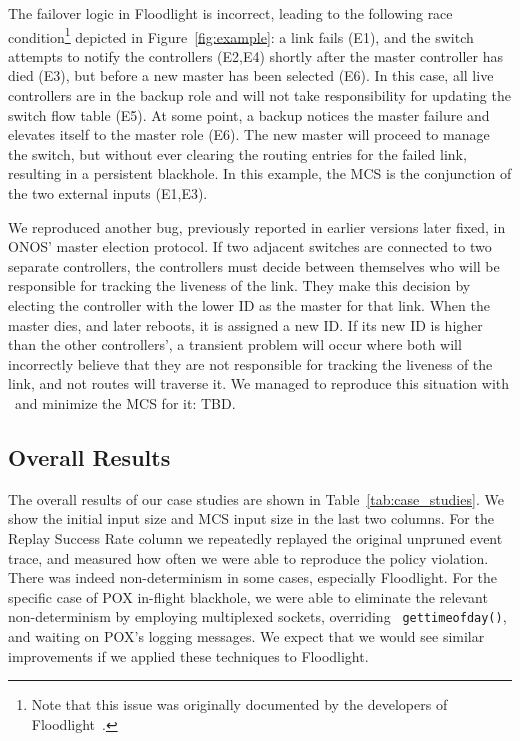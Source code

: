 {The failover logic in Floodlight is incorrect, leading to the
following race condition\footnote{Note that this issue was
originally documented by the developers of Floodlight~\cite{floodlight_bug}.} depicted in
Figure~\ref{fig:example}:
a link fails (E1), and the switch attempts to notify the controllers (E2,E4) shortly after the master
controller has died (E3), but before a new master has been selected (E6). In this case, all live controllers are in
the backup role and will not take responsibility for updating the switch
flow table (E5). At some point, a backup notices the master failure and
elevates itself to the master role (E6). The new master will proceed to manage
the switch, but without ever clearing the routing entries for
the failed link, resulting in a persistent blackhole. In this example, the MCS
is the conjunction of the two external inputs (E1,E3).
}

 We reproduced another bug,
previously reported in earlier versions later fixed, in
ONOS' master election protocol. If two adjacent switches are connected to two
separate controllers, the controllers must decide between themselves who will
be responsible for tracking the liveness of the link. They make this decision
by electing the controller with the lower ID as the master for that link.
When the master dies, and later reboots, it is assigned a new ID. If
its new ID is higher than the other controllers', a transient problem will
occur where both will incorrectly
believe that they are not responsible for tracking the liveness of the link,
and not routes will traverse it. We managed to reproduce this situation with
\projectname~and minimize the MCS for it: \num{TBD.}



\subsection{Overall Results}

The overall results of our case studies are
shown in Table~\ref{tab:case_studies}.
\num{We show the initial input size and MCS input size in the last two
columns.}
For the Replay Success Rate column we
repeatedly replayed the original unpruned event trace, and measured how often we
were able to reproduce the policy violation. There was indeed non-determinism
in some cases, especially Floodlight. For the specific case of
POX in-flight blackhole, we were able to eliminate the relevant
non-determinism by employing multiplexed sockets, overriding {\tt
gettimeofday()}, and waiting on
POX's logging messages. \num{We expect that we would see similar improvements if we
applied these techniques to Floodlight.}


